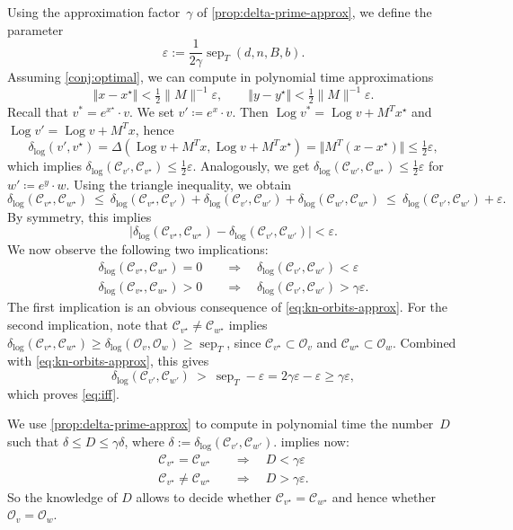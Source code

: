 \documentclass[a4paper,USenglish,cleveref,numberwithinsect]{lipics-v2021}
\DeclareMathOperator{\sep}{sep}
\DeclareMathOperator{\Log}{Log}
\newcommand{\distLD}{\delta_{\log}}
\newcommand{\OO}{\ensuremath{\mathcal{O}}}
\newcommand{\KK}{\ensuremath{\mathcal{C}}}
\numberwithin{equation}{section}
\begin{document}
Using the approximation factor~$\gamma$ of \cref{prop:delta-prime-approx}, we define the parameter
$$
 \varepsilon :=\frac{1}{2\gamma} \sep_T(d,n,B,b) .
$$
Assuming \cref{conj:optimal}, we can compute in polynomial time approximations
\[
    \Vert x - x^\star \Vert <  \tfrac12\|M\|^{-1} \varepsilon, \qquad
    \Vert y-y^\star\Vert < \tfrac12\|M\|^{-1} \varepsilon . %
\]
Recall that  $v^\ast = e^{x^\star}\cdot v$. We set $v'\coloneqq e^x\cdot v$. Then
$\Log v^\ast = \Log v + M^Tx^\star$ and $\Log v' = \Log v + M^Tx$, hence
$$
 \distLD(v',v^\star) = \Delta(\Log v + M^T x , \Log v + M^T x^\star) =\Vert M^T(x-x^\star)\Vert
     \leq \tfrac12 \varepsilon ,
$$
which implies
$\distLD(\KK_{v'},\KK_{v^\star}) \le \tfrac12 \varepsilon$.
Analogously, we get
$\distLD(\KK_{w'},\KK_{w^\star}) \le \tfrac12 \varepsilon$
for $w'\coloneqq e^y\cdot w$.
Using the triangle inequality, we obtain
$$
 \distLD(\KK_{v^\star},\KK_{w^\star}) \ \le\ \distLD(\KK_{v^\star},\KK_{v'}) + \distLD(\KK_{v'},\KK_{w'}) + \distLD(\KK_{w'},\KK_{w^\star})
  \ \le\ \distLD(\KK_{v'},\KK_{w'}) + \varepsilon .
$$
By symmetry, this implies
\begin{equation} \label{eq:kn-orbits-approx}
     \big| \distLD(\KK_{v^\star},\KK_{w^\star}) - \distLD(\KK_{v'},\KK_{w'})\big| < \varepsilon .
\end{equation}
We now observe the following two implications:
\begin{equation}\label{eq:iff}
\begin{split}
     \distLD(\KK_{v^\star},\KK_{w^\star}) = 0\quad & \Longrightarrow \quad \distLD(\KK_{v'},\KK_{w'}) < \varepsilon\\
      \distLD(\KK_{v^\star},\KK_{w^\star}) > 0\quad & \Longrightarrow \quad \distLD(\KK_{v'},\KK_{w'}) > \gamma \varepsilon .
\end{split}
\end{equation}
The first implication is an obvious consequence of \cref{eq:kn-orbits-approx}.
For the second implication, note that
$\KK_{v^\star} \ne \KK_{w^\star}$ implies
$\distLD(\KK_{v^\star},\KK_{w^\star}) \ge \distLD(\OO_{v},\OO_{w}) \ge \sep_T$,
since $\KK_{v^\star} \subset \OO_v$ and $\KK_{w^\star} \subset \OO_w$.
Combined with \cref{eq:kn-orbits-approx}, this gives
$$
 \distLD(\KK_{v'},\KK_{w'}) \ >\  \sep_T  - \varepsilon = 2\gamma \varepsilon  - \varepsilon \ge  \gamma \varepsilon ,
$$
which proves \cref{eq:iff}.

We use \cref{prop:delta-prime-approx} to compute in polynomial time the number~$D$ such that
$\delta \leq D \leq \gamma \delta$, where $\delta:=\distLD (\KK_{v'} , \KK_{w'})$.
 implies now:
\begin{equation*}
\begin{split}
     \KK_{v^\star}= \KK_{w^\star}\quad & \Longrightarrow \quad   D < \gamma\varepsilon\\
     \KK_{v^\star}\ne \KK_{w^\star}\quad & \Longrightarrow \quad D > \gamma\varepsilon .
\end{split}
\end{equation*}
So the knowledge of $D$ allows to decide whether $\KK_{v^\star}= \KK_{w^\star}$
and hence whether $\OO_{v}= \OO_{w}$.



\end{document}
